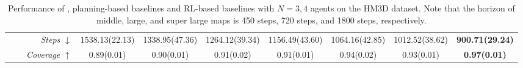 \begin{table*}
{{\begin{tabular}{ccrccc|ccc|c}
\cmidrule{3-10}
                          & & \textit{Steps} $\downarrow$   &1538.13\scriptsize{(22.13)} & 1338.95\scriptsize{(47.36)}&
                          1264.12\scriptsize{(39.34)} & 1156.49\scriptsize{(43.60)}&
                          1064.16\scriptsize{(42.85)}&
                          1012.52\scriptsize{(38.62)}  & \textbf{900.71\scriptsize{(29.24)}} \\ 
\cmidrule{3-10}
                       & & \textit{Coverage} $\uparrow$  &   0.89\scriptsize{(0.01)} & 0.90\scriptsize{(0.01)}&   0.91\scriptsize{(0.02)} &0.91\scriptsize{(0.01)} &0.94\scriptsize{(0.02)}&   0.93\scriptsize{(0.01)}& \textbf{0.97\scriptsize{(0.01)}}    \\
\bottomrule
\end{tabular}}}
\caption{Performance of {\name}, planning-based baselines and RL-based baselines with $N=3,4$ agents on the HM3D dataset. Note that the horizon of middle, large, and super large maps is 450 steps, 720 steps, and 1800 steps, respectively.}
\label{tab: hm3d_results}
\vspace{-6mm}
\end{table*}



